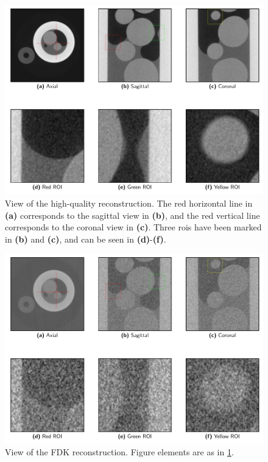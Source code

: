 \begin{figure}[htbp]
  \centering
  \includegraphics[width=.85\textwidth]{figures/kimroberthq-x475y620s250.pdf}
  \caption[High-quality]{View of the high-quality reconstruction. The red horizontal line in \textbf{(a)} corresponds to the sagittal view in \textbf{(b)}, and the red vertical line corresponds to the coronal view in \textbf{(c)}. Three \acrshort{roi}s have been marked in \textbf{(b)} and \textbf{(c)}, and can be seen in \textbf{(d)}-\textbf{(f)}. }
  \label{fig:sideplothq}
\end{figure}

\begin{figure}[htbp]
  \centering
  \includegraphics[width=.85\textwidth]{figures/kimrobertfdk-x475y620s250.pdf}
  \caption[FDK]{View of the FDK reconstruction. Figure elements are as in \cref{fig:sideplothq}. }
  \label{fig:sideplotfdk}
\end{figure}

